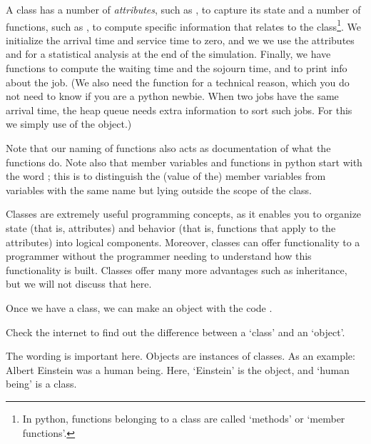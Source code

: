 A class has a number of \emph{attributes}, such as , to capture its state and a number of functions, such as , to compute specific information that relates to the class\footnote{In python, functions belonging to a class are called `methods' or `member functions'.}.
We initialize the arrival time and service time to zero, and we we use the attributes  and  for a statistical analysis at the end of the simulation.
Finally, we have functions to compute the waiting time and the sojourn time, and  to print info about the job.
(We also need the function  for a technical reason, which you do not need to know if you are a python newbie.
When two jobs have the same arrival time, the heap queue needs extra information to sort such jobs.
For this we simply use  of the object.)


Note that our naming of functions also acts as documentation of what the functions do.
Note also that member variables and functions in python start with the word ; this is to distinguish the (value of the) member variables from variables with the same name but lying outside the scope of the class.

Classes are extremely useful programming concepts, as it enables you to organize state (that is, attributes) and behavior (that is, functions that apply to the attributes) into logical components.
Moreover, classes can offer functionality to a programmer without the programmer needing to understand how this functionality is built.
Classes offer many more advantages such as inheritance, but we will not discuss that here.

Once we have a class, we can make an object with the code .

\begin{exercise}
  Check the internet to find out the difference between a `class' and an `object'. 
  \begin{solution}
    The wording is important here.
    Objects are instances of classes.
    As an example: Albert Einstein was a human being.
    Here, `Einstein' is the object, and `human being' is a class.
  \end{solution}
\end{exercise}


